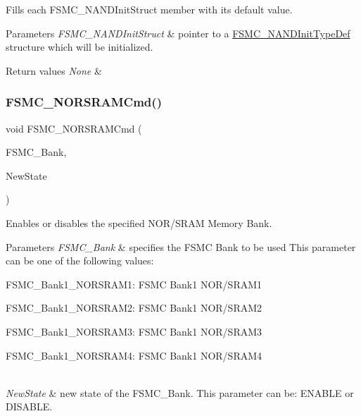 Fills each F\+S\+M\+C\+\_\+\+N\+A\+N\+D\+Init\+Struct member with its default value. 


\begin{DoxyParams}{Parameters}
{\em F\+S\+M\+C\+\_\+\+N\+A\+N\+D\+Init\+Struct} & pointer to a \mbox{\hyperlink{struct_f_s_m_c___n_a_n_d_init_type_def}{F\+S\+M\+C\+\_\+\+N\+A\+N\+D\+Init\+Type\+Def}} structure which will be initialized. \\
\hline
\end{DoxyParams}

\begin{DoxyRetVals}{Return values}
{\em None} & \\
\hline
\end{DoxyRetVals}
\mbox{\label{group___f_s_m_c___private___functions_gaf943f0f2680168d3a95a3c2c9f3eca2a}} 
\subsubsection{\texorpdfstring{FSMC\_NORSRAMCmd()}{FSMC\_NORSRAMCmd()}}
{\footnotesize\ttfamily void F\+S\+M\+C\+\_\+\+N\+O\+R\+S\+R\+A\+M\+Cmd (\begin{DoxyParamCaption}\item[{uint32\+\_\+t}]{F\+S\+M\+C\+\_\+\+Bank,  }\item[{\mbox{\hyperlink{group___exported__types_gac9a7e9a35d2513ec15c3b537aaa4fba1}{Functional\+State}}}]{New\+State }\end{DoxyParamCaption})}



Enables or disables the specified N\+O\+R/\+S\+R\+AM Memory Bank. 


\begin{DoxyParams}{Parameters}
{\em F\+S\+M\+C\+\_\+\+Bank} & specifies the F\+S\+MC Bank to be used This parameter can be one of the following values\+: \begin{DoxyItemize}
\item F\+S\+M\+C\+\_\+\+Bank1\+\_\+\+N\+O\+R\+S\+R\+A\+M1\+: F\+S\+MC Bank1 N\+O\+R/\+S\+R\+A\+M1\end{DoxyItemize}
\begin{DoxyItemize}
\item F\+S\+M\+C\+\_\+\+Bank1\+\_\+\+N\+O\+R\+S\+R\+A\+M2\+: F\+S\+MC Bank1 N\+O\+R/\+S\+R\+A\+M2 \item F\+S\+M\+C\+\_\+\+Bank1\+\_\+\+N\+O\+R\+S\+R\+A\+M3\+: F\+S\+MC Bank1 N\+O\+R/\+S\+R\+A\+M3 \item F\+S\+M\+C\+\_\+\+Bank1\+\_\+\+N\+O\+R\+S\+R\+A\+M4\+: F\+S\+MC Bank1 N\+O\+R/\+S\+R\+A\+M4 \end{DoxyItemize}
\\
\hline
{\em New\+State} & new state of the F\+S\+M\+C\+\_\+\+Bank. This parameter can be\+: E\+N\+A\+B\+LE or D\+I\+S\+A\+B\+LE. \\
\hline
\end{DoxyParams}


